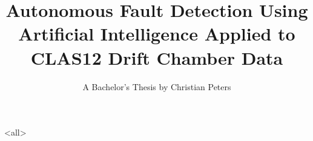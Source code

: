 \documentclass[english, ignorenonframetext]{beamer}
\title[Autonomous Fault Detection Using AI Applied to CLAS12 Drift
  Chamber]{Autonomous
  Fault Detection Using Artificial Intelligence Applied to CLAS12
  Drift Chamber Data}
\author[Christian Peters]{A Bachelor's Thesis by Christian Peters}
\begin{document}
\mode<all>
\begin{frame}
  \maketitle
\end{frame}













\begin{frame}[allowframebreaks]
  \nocite{*}
  \printbibliography
\end{frame}



\mode*
\end{document}
